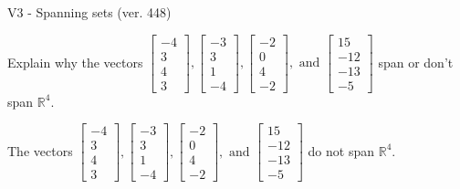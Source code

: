 \begin{exercise}
  \begin{exerciseTitle}V3 - Spanning sets (ver. 448)\end{exerciseTitle}
  \begin{exerciseStatement}
    Explain why the vectors \(\left[\begin{array}{r}
-4 \\
3 \\
4 \\
3
\end{array}\right] , \left[\begin{array}{r}
-3 \\
3 \\
1 \\
-4
\end{array}\right] , \left[\begin{array}{r}
-2 \\
0 \\
4 \\
-2
\end{array}\right] , \text{ and } \left[\begin{array}{r}
15 \\
-12 \\
-13 \\
-5
\end{array}\right]\) span or don't span \(\mathbb{R}^4\). 
	


  \end{exerciseStatement}
  \begin{exerciseAnswer}
   The vectors \(\left[\begin{array}{r}
-4 \\
3 \\
4 \\
3
\end{array}\right] , \left[\begin{array}{r}
-3 \\
3 \\
1 \\
-4
\end{array}\right] , \left[\begin{array}{r}
-2 \\
0 \\
4 \\
-2
\end{array}\right] , \text{ and } \left[\begin{array}{r}
15 \\
-12 \\
-13 \\
-5
\end{array}\right]\) 
  	 do not  
	span \(\mathbb{R}^4\).
  


  \end{exerciseAnswer}
\end{exercise}